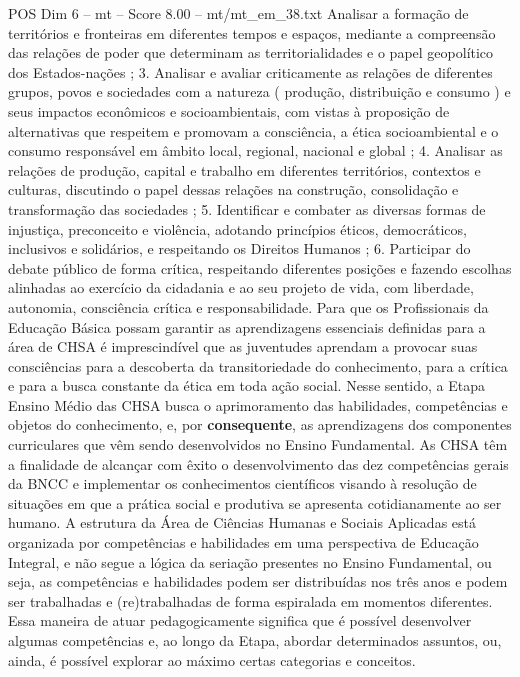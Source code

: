 \begin{textsample}{POS Dim 6 – mt – Score 8.00 – mt/mt\_em\_38.txt}
Analisar a formação de territórios e fronteiras em diferentes tempos e espaços, mediante a compreensão das relações de poder que determinam as territorialidades e o papel geopolítico dos Estados-nações ; 3.
Analisar e avaliar criticamente as relações de diferentes grupos, povos e sociedades com a natureza ( produção, distribuição e consumo ) e seus impactos econômicos e socioambientais, com vistas à proposição de alternativas que respeitem e promovam a consciência, a ética socioambiental e o consumo responsável em âmbito local, regional, nacional e global ; 4.
Analisar as relações de produção, capital e trabalho em diferentes territórios, contextos e culturas, discutindo o papel dessas relações na construção, consolidação e transformação das sociedades ; 5.
Identificar e combater as diversas formas de injustiça, preconceito e violência, adotando princípios éticos, democráticos, inclusivos e solidários, e respeitando os Direitos Humanos ; 6.
Participar do debate público de forma crítica, respeitando diferentes posições e fazendo escolhas alinhadas ao exercício da cidadania e ao seu projeto de vida, com liberdade, autonomia, consciência crítica e responsabilidade.
Para que os Profissionais da Educação Básica possam garantir as aprendizagens essenciais definidas para a área de CHSA é imprescindível que as juventudes aprendam a provocar suas consciências para a descoberta da transitoriedade do conhecimento, para a crítica e para a busca constante da ética em toda ação social.
Nesse sentido, a Etapa Ensino Médio das CHSA busca o aprimoramento das habilidades, competências e objetos do conhecimento, e, por \textbf{consequente}, as aprendizagens dos componentes curriculares que vêm sendo desenvolvidos no Ensino Fundamental.
As CHSA têm a finalidade de alcançar com êxito o desenvolvimento das dez competências gerais da BNCC e implementar os conhecimentos científicos visando à resolução de situações em que a prática social e produtiva se apresenta cotidianamente ao ser humano.
A estrutura da Área de Ciências Humanas e Sociais Aplicadas está organizada por competências e habilidades em uma perspectiva de Educação Integral, e não segue a lógica da seriação presentes no Ensino Fundamental, ou seja, as competências e habilidades podem ser distribuídas nos três anos e podem ser trabalhadas e (re)trabalhadas de forma espiralada em momentos diferentes.
Essa maneira de atuar pedagogicamente significa que é possível desenvolver algumas competências e, ao longo da Etapa, abordar determinados assuntos, ou, ainda, é possível explorar ao máximo certas categorias e conceitos.

\end{textsample}

